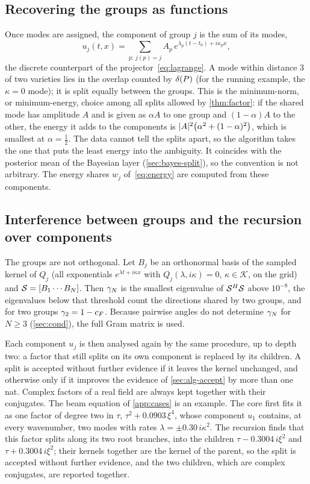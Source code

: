 \subsection{Recovering the groups as functions}\label{sec:alg-components}
Once modes are assigned, the component of group $j$ is the sum of its modes,
\begin{equation}\label{eq:uj}
  u_j(t,x)=\sum_{p:\,j(p)=j}A_p\,e^{\lambda_p(t-t_0)+i\kappa_px},
\end{equation}
the discrete counterpart of the projector~\eqref{eq:lagrange}. A mode within distance $3$ of two
varieties lies in the overlap counted by $\delta(P)$ (for the running example, the $\kappa=0$ mode); it is
split equally between the groups. This is the minimum-norm, or minimum-energy, choice among all splits allowed by
\cref{thm:factor}: if the shared mode has amplitude $A$ and is given as $\alpha A$ to one group and $(1-\alpha)A$ to the
other, the energy it adds to the components is $\lvert A\rvert^2\big(\alpha^2+(1-\alpha)^2\big)$, which is smallest at
$\alpha=\tfrac12$. The data cannot tell the splits apart, so the algorithm takes the one that puts the least energy
into the ambiguity. It coincides with the posterior mean of the Bayesian layer (\cref{sec:bayes-split}), so the
convention is not arbitrary. The energy shares $w_j$ of~\eqref{eq:energy}
are computed from these components.

\subsection{Interference between groups and the recursion over components}\label{sec:alg-interference}
The groups are not orthogonal. Let $B_j$ be an orthonormal basis of the sampled kernel of $Q_j$ (all
exponentials $e^{\lambda t+i\kappa x}$ with $Q_j(\lambda,i\kappa)=0$, $\kappa\in\mathcal K$, on the grid) and
$\mathcal{S}=[B_1\cdots B_N]$. Then $\gamma_{N}$ is the smallest eigenvalue of $\mathcal{S}^H\mathcal{S}$ above $10^{-8}$, the
eigenvalues below that threshold count the directions shared by two groups, and for two groups
$\gamma_2=1-c_{F}$. Because pairwise angles do not determine $\gamma_{N}$ for $N\ge3$ (\cref{sec:cond}), the full
Gram matrix is used.

Each component $u_j$ is then analysed again by the same procedure, up to depth two: a factor that still
splits on its own component is replaced by its children. A split is accepted without further evidence
if it leaves the kernel unchanged, and otherwise only if it improves the evidence of \cref{sec:alg-accept} by more
than one nat. Complex factors of a real field are always kept together with their conjugates. The beam equation of
\cref{app:cases} is an example. The core first fits it as one factor of degree two in $\tau$,
$\tau^2+0.0903\,\xi^4$, whose component $u_1$ contains, at every wavenumber, two modes with rates
$\lambda=\pm0.30\,i\kappa^2$. The recursion finds that this factor splits along its two root branches, into the children
$\tau-0.3004\,i\xi^2$ and $\tau+0.3004\,i\xi^2$; their kernels together are the kernel of the parent, so the split is
accepted without further evidence, and the two children, which are complex conjugates, are reported together.

